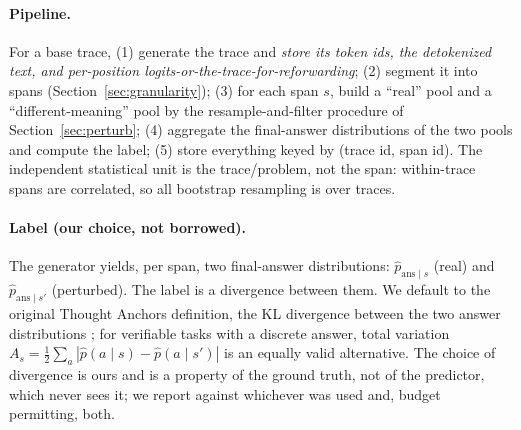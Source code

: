 \documentclass[11pt]{article}
\begin{document}
\paragraph{Pipeline.} For a base trace, (1) generate the trace and \emph{store its token ids, the detokenized text, and per-position logits-or-the-trace-for-reforwarding}; (2) segment it into spans (Section~\ref{sec:granularity}); (3) for each span $s$, build a ``real'' pool and a ``different-meaning'' pool by the resample-and-filter procedure of Section~\ref{sec:perturb}; (4) aggregate the final-answer distributions of the two pools and compute the label; (5) store everything keyed by (trace id, span id). The independent statistical unit is the trace/problem, not the span: within-trace spans are correlated, so all bootstrap resampling is over traces.

\paragraph{Label (our choice, not borrowed).} The generator yields, per span, two final-answer distributions: $\hat p_{\text{ans}\mid s}$ (real) and $\hat p_{\text{ans}\mid s'}$ (perturbed). The label is a divergence between them. We default to the original Thought Anchors definition, the KL divergence between the two answer distributions \cite{bogdan2025thoughtanchors}; for verifiable tasks with a discrete answer, total variation $A_s = \tfrac12\sum_a |\hat p(a\mid s)-\hat p(a\mid s')|$ is an equally valid alternative. The choice of divergence is ours and is a property of the ground truth, not of the predictor, which never sees it; we report against whichever was used and, budget permitting, both.
\end{document}
